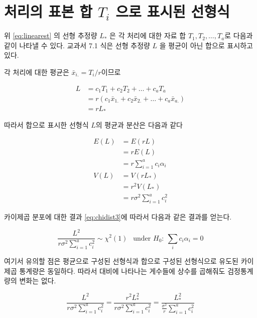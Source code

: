 \documentclass[
]{book}
\begin{document}
\hypertarget{uxcc98uxb9acuxc758-uxd45cuxbcf8-uxd569-t_i-uxc73cuxb85c-uxd45cuxc2dcuxb41c-uxc120uxd615uxc2dd}{%
\section{\texorpdfstring{처리의 표본 합 \(T_i\) 으로 표시된 선형식}{처리의 표본 합 T\_i 으로 표시된 선형식}}\label{uxcc98uxb9acuxc758-uxd45cuxbcf8-uxd569-t_i-uxc73cuxb85c-uxd45cuxc2dcuxb41c-uxc120uxd615uxc2dd}}

위 \eqref{eq:linearest} 의 선형 추정량 \(L_*\) 은 각 처리에 대한 자료 합 \(T_1, T_2, \dots , T_a\)로 다음과 같이 나타낼 수 있다. 교과서 7.1 식은 선형 추정량 \(L\) 을 평균이 아닌 합으로 표시하고 있다.

각 처리에 대한 평균은 \(\bar x_{i.} = T_i / r\)이므로

\begin{align*}
L  & = c_1 T_1 + c_2 T_2 + \dots + c_a T_a  \\
  & = r( c_1 \bar x_{1.} + c_2 \bar x_{2.} + \dots + c_a \bar x_{a.} ) \\
  & =r L_*
\end{align*}

따라서 합으로 표시한 선형식 \(L\)의 평균과 분산은 다음과 같다

\begin{align*}
E(L) & =  E(rL) \\
   & = r E(L) \\
   & = r \sum_{i=1}^a c_i \alpha_i \\
V(L) & = V(rL_*) \\
   & = r^2 V(L_*) \\
   & = r \sigma^2 \sum_{i=1}^a c_i^2
\end{align*}

카이제곱 분포에 대한 결과 \eqref{eq:chidist3}에 따라서 다음과 같은 결과를 얻는다.

\begin{equation}
\frac{L^2}{r\sigma^2  \sum_{i=1}^a c_i^2 } \sim \chi^2(1) ~~\text{ under } H_0: ~  \sum_i c_i \alpha_i =0
\label{eq:lineardistnulltotal}
\end{equation}

여기서 유의할 점은 평균으로 구성된 선형식과 합으로 구성된 선형식으로 유도된 카이제곱 통계량은 동일하다.
따라서 대비에 나타나는 게수들에 상수를 곱해줘도 검정통계량의 변화는 없다.

\[ \frac{L^2}{ r\sigma^2  \sum_{i=1}^a c_i^2}  = \frac{r^2 L_*^2}{r\sigma^2  \sum_{i=1}^a c_i^2 } = \frac{L_*^2}{\tfrac{\sigma^2}{r} \sum_{i=1}^a c_i^2 } \]
\end{document}
